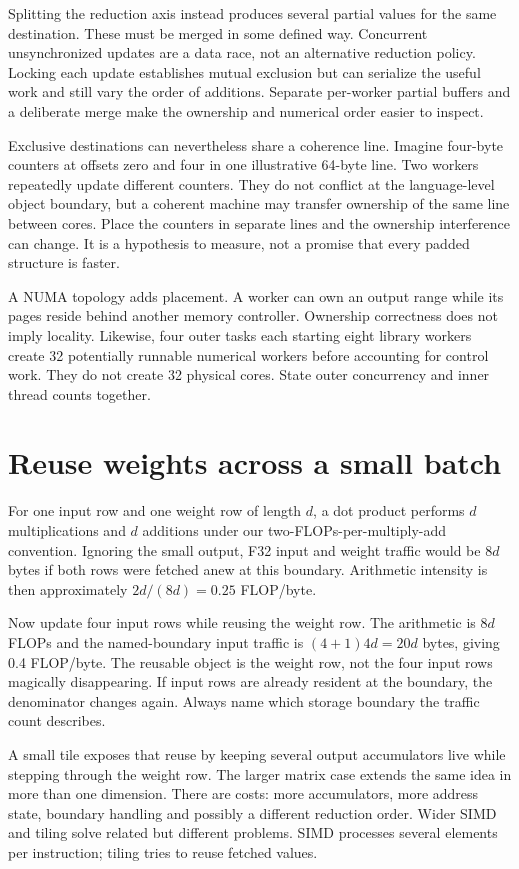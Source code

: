 Splitting the reduction axis instead produces several partial
values for the same destination. These must be merged in
some defined way. Concurrent unsynchronized updates are a
data race, not an alternative reduction policy. Locking
each update establishes mutual exclusion but can serialize
the useful work and still vary the order of additions.
Separate per-worker partial buffers and a deliberate merge
make the ownership and numerical order easier to inspect.

Exclusive destinations can nevertheless share a coherence
line. Imagine four-byte counters at offsets zero and four
in one illustrative 64-byte line. Two workers repeatedly
update different counters. They do not conflict at the
language-level object boundary, but a coherent machine may
transfer ownership of the same line between cores. Place
the counters in separate lines and the ownership interference
can change. It is a hypothesis to measure, not a promise
that every padded structure is faster.

A NUMA topology adds placement. A worker can own an output
range while its pages reside behind another memory controller.
Ownership correctness does not imply locality. Likewise,
four outer tasks each starting eight library workers create
32 potentially runnable numerical workers before accounting
for control work. They do not create 32 physical cores.
State outer concurrency and inner thread counts together.

\section{Reuse weights across a small batch}
For one input row and one weight row of length $d$, a dot
product performs $d$ multiplications and $d$ additions under
our two-FLOPs-per-multiply-add convention. Ignoring the small
output, F32 input and weight traffic would be $8d$ bytes
if both rows were fetched anew at this boundary. Arithmetic
intensity is then approximately $2d/(8d)=0.25$ FLOP/byte.

Now update four input rows while reusing the weight row.
The arithmetic is $8d$ FLOPs and the named-boundary input
traffic is $(4+1)4d=20d$ bytes, giving 0.4 FLOP/byte.
The reusable object is the weight row, not the four input
rows magically disappearing. If input rows are already
resident at the boundary, the denominator changes again.
Always name which storage boundary the traffic count describes.

A small tile exposes that reuse by keeping several output
accumulators live while stepping through the weight row.
The larger matrix case extends the same idea in more than
one dimension. There are costs: more accumulators, more
address state, boundary handling and possibly a different
reduction order. Wider SIMD and tiling solve related but
different problems. SIMD processes several elements per
instruction; tiling tries to reuse fetched values.

